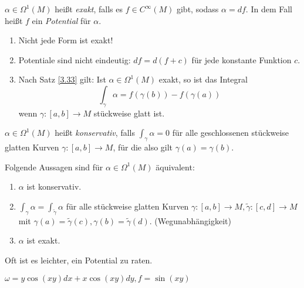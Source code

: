 \lecture

\begin{defn}
	$ \alpha \in \Omega^1(M) $ heißt \emph{exakt}, falls es $f \in C^\infty(M)$ gibt, sodass $ \alpha = df $. In dem Fall heißt $f$ ein \emph{Potential} für $\alpha$.
\end{defn}

\begin{rem*}
	\begin{enumerate}[label={\roman*})]
		\item Nicht jede Form ist exakt!
		\item Potentiale sind nicht eindeutig: $ df = d(f+c) $ für jede konstante Funktion $c$.
		\item Nach Satz \ref{3.33} gilt: Ist $\alpha \in \Omega^1(M)$ exakt, so ist das Integral
			\[ \int_\gamma \alpha = f(\gamma(b)) - f(\gamma(a)) \]
			wenn $\gamma: [a,b] \to M$ stückweise glatt ist.
	\end{enumerate}
\end{rem*}

\begin{defn}
	$ \alpha \in \Omega^1(M) $ heißt \emph{konservativ}, falls $ \int_\gamma \alpha = 0 $ für alle geschlossenen stückweise glatten Kurven $ \gamma: [a,b] \to M $, für die also gilt $\gamma(a) = \gamma (b)$.
\end{defn}

\begin{thm}
	Folgende Aussagen sind für $ \alpha \in \Omega^1(M) $ äquivalent:
	\begin{enumerate}[label={\roman*})]
		\item $\alpha$ ist konservativ.
		\item $\int_\gamma \alpha = \int_{\tilde{\gamma}} \alpha$ für alle stückweise glatten Kurven $ \gamma: [a,b] \to M, \tilde{\gamma}: [c,d] \to M $ mit $ \gamma(a) = \tilde{\gamma}(c), \gamma(b) = \tilde{\gamma}(d). $ (Wegunabhängigkeit)
		\item $\alpha$ ist exakt.
	\end{enumerate}
\end{thm}

\begin{rem*}
	Oft ist es leichter, ein Potential zu raten.
	\begin{exmp*}
		$\omega = y\cos(xy) dx + x\cos(xy)dy, f = \sin(xy)$
	\end{exmp*}
\end{rem*}

